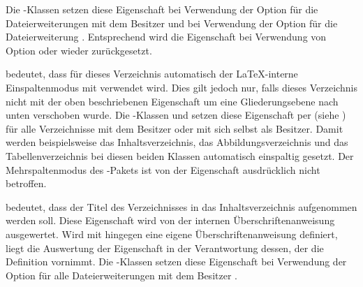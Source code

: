 \begin{description}
  Die \KOMAScript-Klassen setzen diese Eigenschaft bei Verwendung der Option
   für die Dateierweiterungen mit
  dem Besitzer  und bei Verwendung der Option
   für die Dateierweiterung
  . Entsprechend
  wird die Eigenschaft bei Verwendung von Option
   oder
   wieder zurückgesetzt.
\item[\PValue{onecolumn}] \leavevmode{}%
  bedeutet, dass für dieses Verzeichnis automatisch der \LaTeX-interne
  Einspaltenmodus mit  verwendet
  wird. Dies gilt jedoch nur, falls dieses Verzeichnis
  nicht mit der oben beschriebenen Eigenschaft
   um eine Gliederungsebene
  nach unten verschoben wurde. Die \KOMAScript-Klassen  und
   setzen diese Eigenschaft per
   (siehe
  ) für alle Verzeichnisse mit dem
  Besitzer  oder mit sich selbst als Besitzer. Damit werden
  beispielsweise das Inhaltsverzeichnis, das Abbildungsverzeichnis und das
  Tabellenverzeichnis bei diesen beiden Klassen automatisch einspaltig
  gesetzt. Der Mehrspaltenmodus des
  -Pakets ist von der Eigenschaft
  ausdrücklich nicht betroffen.
\item[\PValue{totoc}] bedeutet, dass der Titel des Verzeichnisses in das
  Inhaltsverzeichnis aufgenommen werden soll. Diese Eigenschaft wird von der
  internen Überschriftenanweisung ausgewertet. Wird mit
   hingegen eine eigene Überschriftenanweisung
  definiert, liegt die Auswertung der Eigenschaft in der Verantwortung dessen,
  der die Definition vornimmt. Die \KOMAScript-Klassen setzen diese
  Eigenschaft bei Verwendung der Option
   für alle Dateierweiterungen mit dem
  Besitzer .
\end{description}
